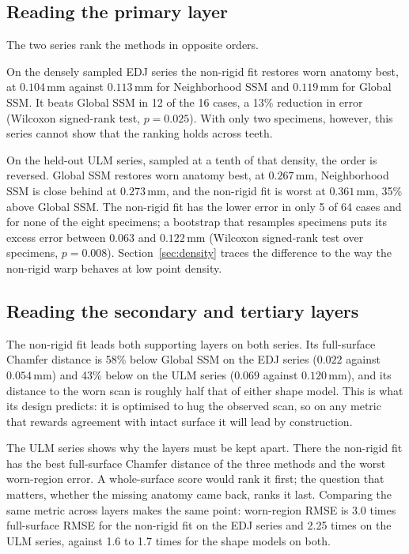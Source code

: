 \documentclass[10pt,a4paper,twocolumn]{article}
\newcommand{\mm}{\,\mathrm{mm}}
\begin{document}
\subsection{Reading the primary layer}
\label{sec:primary}

The two series rank the methods in opposite orders.

On the densely sampled EDJ series the non-rigid fit restores worn anatomy best,
at $0.104\mm$ against $0.113\mm$ for Neighborhood SSM and $0.119\mm$ for Global
SSM. It beats Global SSM in 12 of the 16 cases, a 13\% reduction in error
(Wilcoxon signed-rank test, $p=0.025$). With only two specimens, however, this
series cannot show that the ranking holds across teeth.

On the held-out ULM series, sampled at a tenth of that density, the order is
reversed. Global SSM restores worn anatomy best, at $0.267\mm$, Neighborhood SSM
is close behind at $0.273\mm$, and the non-rigid fit is worst at $0.361\mm$,
35\% above Global SSM. The non-rigid fit has the lower error in only 5 of 64
cases and for none of the eight specimens; a bootstrap that resamples specimens
puts its excess error between $0.063$ and $0.122\mm$ (Wilcoxon signed-rank test
over specimens, $p=0.008$). Section~\ref{sec:density} traces the difference to the
way the non-rigid warp behaves at low point density.

\subsection{Reading the secondary and tertiary layers}
\label{sec:secondary}

The non-rigid fit leads both supporting layers on both series. Its full-surface
Chamfer distance is 58\% below Global SSM on the EDJ series ($0.022$ against
$0.054\mm$) and 43\% below on the ULM series ($0.069$ against $0.120\mm$), and its
distance to the worn scan is roughly half that of either shape model. This is what
its design predicts: it is optimised to hug the observed scan, so on any metric
that rewards agreement with intact surface it will lead by construction.

The ULM series shows why the layers must be kept apart. There the non-rigid fit
has the best full-surface Chamfer distance of the three methods and the worst
worn-region error. A whole-surface score would rank it first; the question that
matters, whether the missing anatomy came back, ranks it last. Comparing the same
metric across layers makes the same point: worn-region RMSE is 3.0 times
full-surface RMSE for the non-rigid fit on the EDJ series and 2.25 times on the
ULM series, against 1.6 to 1.7 times for the shape models on both.
\end{document}

